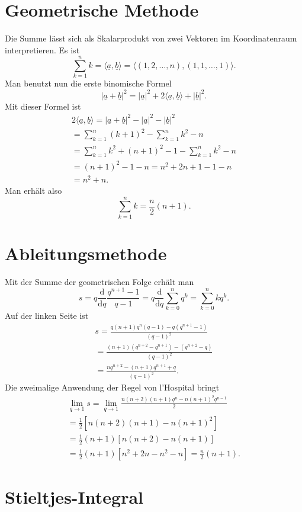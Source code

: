 \documentclass[a4paper,11pt,fleqn,twocolumn,twoside]{scrartcl}
\newcommand{\bvec}[1]{\underline{#1}}
\begin{document}
\section{Geometrische Methode}

Die Summe lässt sich als Skalarprodukt von zwei Vektoren im
Koordinatenraum interpretieren. Es ist%
\[\sum_{k=1}^n k = \langle \bvec a,\bvec b\rangle
= \langle (1,2,\ldots,n),(1,1,\ldots,1)\rangle.\]
Man benutzt nun die erste binomische Formel%
\[|\bvec a+\bvec b|^2
= |\bvec a|^2+2\langle\bvec a,\bvec b\rangle +|\bvec b|^2.\]
Mit dieser Formel ist
\begin{gather*}
2\langle\bvec a,\bvec b\rangle
= |\bvec a+\bvec b|^2-|\bvec a|^2-|\bvec b|^2\\
= \sum_{k=1}^n (k+1)^2-\sum_{k=1}^n k^2-n\\
= \sum_{k=1}^n k^2+(n+1)^2-1-\sum_{k=1}^n k^2-n\\
= (n+1)^2-1-n = n^2+2n+1-1-n\\
= n^2+n.
\end{gather*}
Man erhält also
\[\sum_{k=1}^n k = \frac{n}{2}(n+1).\]

\section{Ableitungsmethode}

Mit der Summe der geometrischen Folge erhält man%
\[s=q\frac{\mathrm d}{\mathrm dq} \frac{q^{n+1}-1}{q-1}
= q\frac{\mathrm d}{\mathrm dq}
\sum_{k=0}^n q^k = \sum_{k=0}^n kq^k.\]
Auf der linken Seite ist
\begin{gather*}
s=\frac{q(n+1)q^n(q-1)-q(q^{n+1}-1)}{(q-1)^2}\\
= \frac{(n+1)(q^{n+2}-q^{n+1})-(q^{n+2}-q)}{(q-1)^2}\\
= \frac{nq^{n+2}-(n+1)q^{n+1}+q}{(q-1)^2}.
\end{gather*}
Die zweimalige Anwendung der Regel von l'Hospital bringt%
\begin{gather*}
\lim_{q\rightarrow 1}s = \lim_{q\rightarrow 1}
\frac{n(n+2)(n+1)q^n-n(n+1)^2q^{n-1}}{2}\\
= \frac{1}{2}[n(n+2)(n+1)-n(n+1)^2]\\
= \frac{1}{2}(n+1)[n(n+2)-n(n+1)]\\
= \frac{1}{2}(n+1)[n^2+2n-n^2-n]
= \frac{n}{2}(n+1).
\end{gather*}

\section{Stieltjes-Integral}
\end{document}

